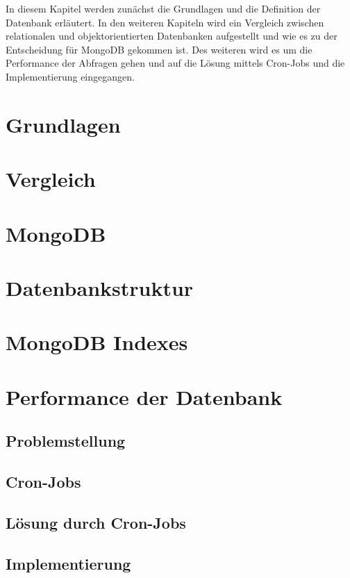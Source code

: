In diesem Kapitel werden zunächst die Grundlagen und die Definition der Datenbank erläutert. In den weiteren Kapiteln wird ein Vergleich zwischen relationalen und objektorientierten Datenbanken aufgestellt und wie es zu der Entscheidung für MongoDB gekommen ist. Des weiteren wird es um die Performance der Abfragen gehen und auf die Lösung mittels Cron-Jobs und die Implementierung eingegangen.

\section{Grundlagen}


\section{Vergleich}


\section{MongoDB}


\section{Datenbankstruktur}


\section{MongoDB Indexes}


\section{Performance der Datenbank}


\subsection{Problemstellung}


\subsection{Cron-Jobs}


\subsection{Lösung durch Cron-Jobs}


\subsection{Implementierung}
